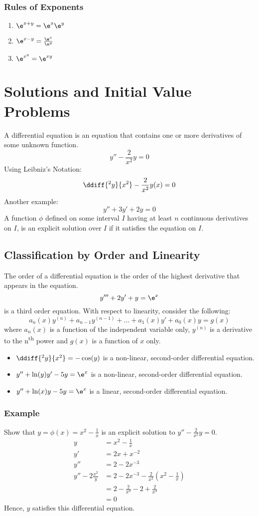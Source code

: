 \documentclass{math}
\begin{document}
\subsubsection*{Rules of Exponents}
\begin{enumerate}
  \item \( \e^{x+y} = \e^x\e^y \)
  \item \( \e^{x-y} = \frac{\e^x}{\e^y} \)
  \item \( \e^{x^y} = \e^{xy} \)
\end{enumerate}

\section*{Solutions and Initial Value Problems}
A differential equation is an equation that contains one or more derivatives of
some unknown function.
\[ y''-\frac{2}{x^2}y = 0 \]
Using Leibniz's Notation:
\[ \ddiff{^2y}{x^2}-\frac{2}{x^2}y(x) = 0 \]
Another example:
\[ y''+3y'+2y = 0 \]
A function \( \phi \) defined on some interval \( I \) having at least \( n \)
continuous derivatives on \( I \), is an explicit solution over \( I \) if it
satisfies the equation on \( I \).

\subsection*{Classification by Order and Linearity}
The order of a differential equation is the order of the highest derivative that
appears in the equation.
\[ y'''+2y'+y = \e^x \]
is a third order equation. With respect to linearity, consider the following:
\[ a_n(x)y^{(n)}+a_{n-1}y^{(n-1)}+\dots+a_1(x)y'+a_0(x)y = g(x) \]
where \( a_n(x) \) is a function of the independent variable only,
\( y^{(n)} \) is a derivative to the n\textsuperscript{th} power and \( g(x) \)
is a function of \( x \) only.
\begin{itemize}
  \item \( \ddiff{^2y}{x^2} = -\cos(y) \) is a non-linear, second-order
  differential equation.
  \item \( y''+\ln(y)y'-5y = \e^x \) is a non-linear, second-order differential
  equation.
  \item \( y''+\ln(x)y-5y = \e^x \) is a linear, second-order differential
  equation.
\end{itemize}

\subsubsection*{Example}
Show that \( y = \phi(x) = x^2-\frac{1}{x} \) is an explicit solution to
\( y''-\frac{2}{x^2}y = 0 \).
\begin{align*}
  y &= x^2-\frac{1}{x} \\
  y' &= 2x+x^{-2} \\
  y'' &= 2-2x^{-3} \\
  y''-2\frac{x^2}y &= 2-2x^{-3}-\frac{2}{x^2}(x^2-\frac{1}{x}) \\
  &= 2-\frac{2}{x^3}-2+\frac{2}{x^3} \\
  &= 0
\end{align*}
Hence, \( y \) satisfies this differential equation.
\end{document}
